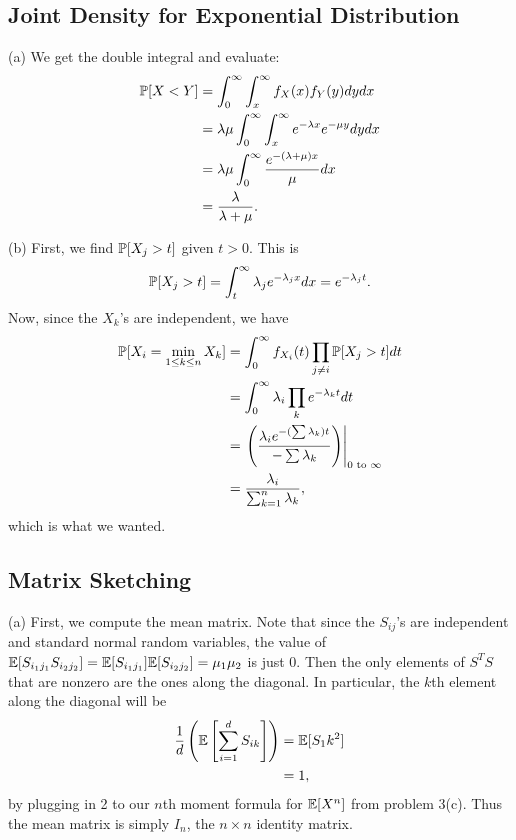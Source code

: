 \subsection{Joint Density for Exponential Distribution}
(a) We get the double integral and evaluate:
\begin{align*}
    \P[X < Y] &= \int_0^\infty \int_x^\infty f_X(x)f_Y(y) dydx \\
        &= \lambda\mu\int_0^\infty \int_x^\infty e^{-\lambda x}e^{-\mu y}dydx \\
        &= \lambda\mu\int_0^\infty\frac{e^{-(\lambda + \mu)x}}{\mu} dx \\
        &= \frac{\lambda}{\lambda + \mu}.
\end{align*}

(b) First, we find $\P[X_j > t]$ given $t > 0$. This is
\[
\P[X_j > t] = \int_t^\infty\lambda_je^{-\lambda_jx}dx = e^{-\lambda_jt}.
\]
Now, since the $X_k$'s are independent, we have
\begin{align*}
    \P[X_i = \min_{1 \leq k \leq n}X_k] &= \int_0^\infty f_{X_i}(t)\prod_{j \neq i}\P[X_j > t]dt \\
    &= \int_0^\infty \lambda_i\prod_k e^{-\lambda_k t} dt \\
    &= \left.\left(\frac{\lambda_i e^{-(\sum \lambda_k)t}}{-\sum \lambda_k}
\right)\right|_{0 \f{ to } \infty} \\
    &= \frac{\lambda_i}{\sum_{k = 1}^n \lambda_k},
\end{align*}
which is what we wanted.

\subsection{Matrix Sketching}
(a) First, we compute the mean matrix. Note that since the $S_{ij}$'s are independent and standard normal random variables, the value of $\E[S_{i_1j_1}S_{i_2j_2}] = \E[S_{i_1j_1}]\E[S_{i_2j_2}] = \mu_1\mu_2$ is just 0. Then the only elements of $S^TS$ that are nonzero are the ones along the diagonal. In particular, the $k$th element along the diagonal will be
\begin{align*}
    \frac{1}{d}\left(\E\left[\sum_{i = 1}^dS_{ik}\right]\right) &= \E[S_1k^2] \\
    &= 1,
\end{align*}
by plugging in 2 to our $n$th moment formula for $\E[X^n]$ from problem 3(c). Thus the mean matrix is simply $I_n$, the $n \times n$ identity matrix.

